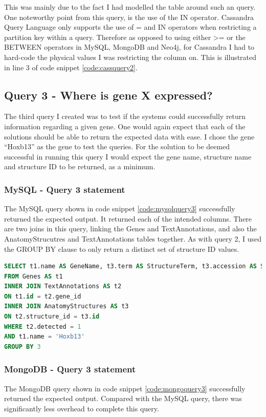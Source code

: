 This was mainly due to the fact I had modelled the table around such an query. One noteworthy point from this query, is the use of the IN operator. Cassandra Query Language only supports the use of = and IN operators when restricting a partition key within a query. Therefore as opposed to using either >= or the BETWEEN operators in MySQL, MongoDB and Neo4j, for Cassandra I had to hard-code the physical values I was restricting the column on. This is illustrated in line 3 of code snippet \ref{code:cassquery2}.

\subsection*{Query 3 - Where is gene X expressed?}\label{query3}
The third query I created was to test if the systems could successfully return information regarding a given gene. One would again expect that each of the solutions should be able to return the expected data with ease. I chose the gene ``Hoxb13'' as the gene to test the queries. For the solution to be deemed successful in running this query I would expect the gene name, structure name and structure ID to be returned, as a minimum.

\subsubsection*{MySQL - Query 3 statement}\label{mysqlquery3statement}
The MySQL query shown in code snippet \ref{code:mysqlquery3} successfully returned the expected output. It returned each of the intended columns. There are two joins in this query, linking the Genes and TextAnnotations, and also the AnatomyStrucutres and TextAnnotations tables together. As with query 2, I used the GROUP BY clause to only return a distinct set of structure ID values.

\begin{lstlisting}[language=SQL, caption=MySQL query 3 statement. Where is gene X expressed?., label=code:mysqlquery3]
SELECT t1.name AS GeneName, t3.term AS StructureTerm, t3.accession AS StructureID
FROM Genes AS t1
INNER JOIN TextAnnotations AS t2
ON t1.id = t2.gene_id
INNER JOIN AnatomyStructures AS t3
ON t2.structure_id = t3.id
WHERE t2.detected = 1
AND t1.name = 'Hoxb13'
GROUP BY 3
\end{lstlisting}
\newpage
\subsubsection*{MongoDB - Query 3 statement}\label{mongoquery3statement}
The MongoDB query shown in code snippet \ref{code:mongoquery3} successfully returned the expected output. Compared with the MySQL query, there was significantly less overhead to complete this query.

